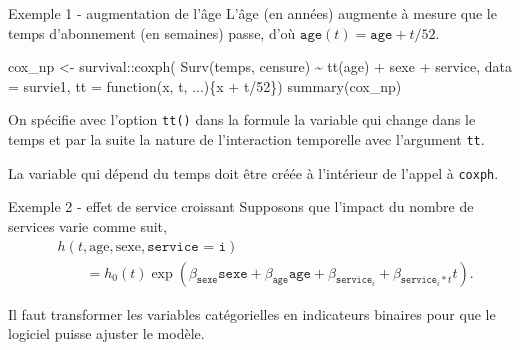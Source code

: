 \documentclass[
  ignorenonframetext,
]{beamer}
\newenvironment{Shaded}{\begin{snugshade}}{\end{snugshade}}
\newcommand{\AttributeTok}[1]{\textcolor[rgb]{0.40,0.45,0.13}{#1}}
\newcommand{\ControlFlowTok}[1]{\textcolor[rgb]{0.00,0.23,0.31}{#1}}
\newcommand{\DecValTok}[1]{\textcolor[rgb]{0.68,0.00,0.00}{#1}}
\newcommand{\FunctionTok}[1]{\textcolor[rgb]{0.28,0.35,0.67}{#1}}
\newcommand{\NormalTok}[1]{\textcolor[rgb]{0.00,0.23,0.31}{#1}}
\newcommand{\OtherTok}[1]{\textcolor[rgb]{0.00,0.23,0.31}{#1}}
\newcommand{\SpecialCharTok}[1]{\textcolor[rgb]{0.37,0.37,0.37}{#1}}
\begin{document}
\begin{frame}[fragile]{Exemple 1 - augmentation de l'âge}
\protect\hypertarget{exemple-1---augmentation-de-luxe2ge}{}
L'âge (en années) augmente à mesure que le temps d'abonnement (en
semaines) passe, d'où \(\texttt{age}(t) = \texttt{age} + t/52\).

\begin{Shaded}
\begin{Highlighting}[numbers=left,,]
\NormalTok{cox\_np }\OtherTok{\textless{}{-}}\NormalTok{ survival}\SpecialCharTok{::}\FunctionTok{coxph}\NormalTok{(}
    \FunctionTok{Surv}\NormalTok{(temps, censure) }\SpecialCharTok{\textasciitilde{}} 
     \FunctionTok{tt}\NormalTok{(age) }\SpecialCharTok{+}\NormalTok{ sexe }\SpecialCharTok{+}\NormalTok{ service, }
     \AttributeTok{data =}\NormalTok{ survie1, }
     \AttributeTok{tt =} \ControlFlowTok{function}\NormalTok{(x, t, ...)\{x }\SpecialCharTok{+}\NormalTok{ t}\SpecialCharTok{/}\DecValTok{52}\NormalTok{\})}
\FunctionTok{summary}\NormalTok{(cox\_np)}
\end{Highlighting}
\end{Shaded}

\footnotesize

On spécifie avec l'option \texttt{tt()} dans la formule la variable qui
change dans le temps et par la suite la nature de l'interaction
temporelle avec l'argument \texttt{tt}.

La variable qui dépend du temps doit être créée à l'intérieur de l'appel
à \texttt{coxph}.
\end{frame}

\begin{frame}{Exemple 2 - effet de service croissant}
\protect\hypertarget{exemple-2---effet-de-service-croissant}{}
Supposons que l'impact du nombre de services varie comme suit,
\begin{align*}
&h(t, \text{age}, \text{sexe}, \texttt{service = i}) \\ &\qquad = h_0(t)\exp(\beta_{\texttt{sexe}}\texttt{sexe} + \beta_{\texttt{age}} \texttt{age} + \beta_{\texttt{service}_i} + \beta_{\texttt{service}_i*t}t).
\end{align*}

Il faut transformer les variables catégorielles en indicateurs binaires
pour que le logiciel puisse ajuster le modèle.
\end{frame}
\end{document}
